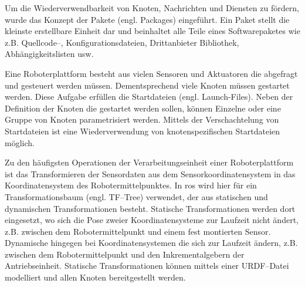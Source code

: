 Um die Wiederverwendbarkeit von Knoten, Nachrichten und Diensten zu fördern, wurde das Konzept der Pakete (engl. Packages) eingeführt. Ein Paket stellt die kleinste erstellbare Einheit dar und beinhaltet alle Teile eines Softwarepaketes wie z.B. Quellcode--, Konfigurationsdateien, Drittanbieter Bibliothek, Abhängigkeitslisten usw.

Eine Roboterplattform besteht aus vielen Sensoren und Aktuatoren die abgefragt und gesteuert werden müssen. Dementsprechend viele Knoten müssen gestartet werden. Diese Aufgabe erfüllen die Startdateien (engl. Launch-Files). Neben der Definition der Knoten die gestartet werden sollen, können Einzelne oder eine Gruppe von Knoten parametrisiert werden. Mittels der Verschachtelung von Startdateien ist eine Wiederverwendung von knotenspezifischen Startdateien möglich.

Zu den häufigsten Operationen der Verarbeitungseinheit einer Roboterplattform ist das Transformieren der Sensordaten aus dem Sensorkoordinatensystem in das Koordinatensystem des Robotermittelpunktes. In \Gls{ros} wird hier für ein Transformationsbaum (engl. TF--Tree) verwendet, der aus statischen und dynamischen Transformationen besteht. Statische Transformationen werden dort eingesetzt, wo sich die Pose zweier Koordinatensysteme zur Laufzeit nicht ändert, z.B. zwischen dem Robotermittelpunkt und einem fest montierten Sensor. Dynamische hingegen bei Koordinatensystemen die sich zur Laufzeit ändern, z.B. zwischen dem Robotermittelpunkt und den Inkrementalgebern der Antriebseinheit. Statische Transformationen können mittels einer URDF--Datei modelliert und allen Knoten bereitgestellt werden.

